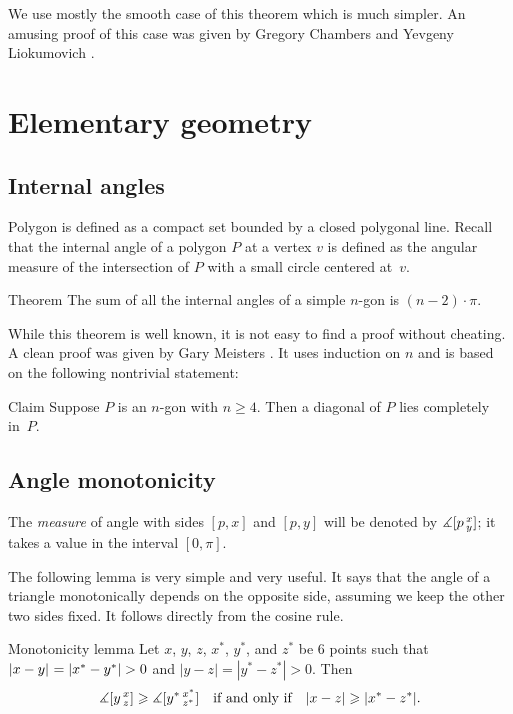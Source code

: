 We use mostly the smooth case of this theorem which is much simpler.
An amusing proof of this case was given by Gregory Chambers and Yevgeny Liokumovich \cite{chambers-liokumovich}.

\section{Elementary geometry}

\subsection*{Internal angles}

Polygon is defined as a compact set bounded by a closed polygonal line. 
Recall that the internal angle of a polygon $P$ at a vertex $v$
is defined as the angular measure of the intersection of $P$ with a small circle centered at~$v$.

\begin{thm}{Theorem}\label{thm:sum=(n-2)pi}
The sum of all the internal angles of a simple $n$-gon is $(n-2)\cdot\pi$. 
\end{thm}

While this theorem is well known, it is not easy to find a proof without cheating.
A clean proof was given by Gary Meisters \cite{meisters}.
It uses induction on $n$ and is based on the following nontrivial statement:

\begin{thm}{Claim}
Suppose $P$ is an $n$-gon with $n\ge 4$.
Then a diagonal of $P$ lies completely in~$P$.
\end{thm}



\subsection*{Angle monotonicity}

The {}\emph{measure} of angle with sides $[p,x]$ and $[p,y]$ will be denoted by $\measuredangle[p\,{}^{x}_{y}]$;
it takes a value in the interval $[0,\pi]$.

The following lemma is very simple and very useful.
It says that the angle of a triangle monotonically depends on the opposite side, assuming we keep the other two sides fixed.
It follows directly from the cosine rule.

\begin{thm}{Monotonicity lemma}\label{lem:angle-monotonicity}
Let $x$, $y$, $z$, $x^{*}$, $y^{*}$, and $z^{*}$ be 6 points such that $\dist{x}{y}{}\z=|x^{*}-y^{*}|>0$ and $|y-z|=|y^{*}-z^{*}|>0$.
Then 
\[\measuredangle[y\,{}^{x}_{z}]
\geqslant
\measuredangle[y^{*}\,{}^{x^{*}}_{z^{*}}]
\quad\text{if and only if}\quad
|x-z|\geqslant |x^{*}-z^{*}|.\]
\end{thm}

